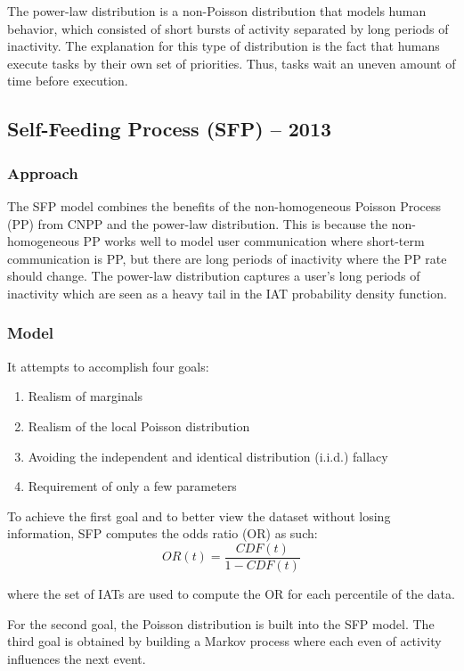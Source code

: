 \documentclass[11pt, oneside]{article}   	%
\begin{document}
\quad The power-law distribution is a non-Poisson distribution that models human behavior, which consisted of short bursts of activity separated by long periods of inactivity.
The explanation for this type of distribution is the fact that humans execute tasks by their own set of priorities.
Thus, tasks wait an uneven amount of time before execution.

\subsection*{Self-Feeding Process (SFP) -- 2013}

\subsubsection*{Approach}

\quad The SFP model combines the benefits of the non-homogeneous Poisson Process (PP) from CNPP and the power-law distribution.
This is because the non-homogeneous PP works well to model user communication where short-term communication is PP, but there are long periods of inactivity where the PP rate should change.
The power-law distribution captures a user's long periods of inactivity which are seen as a heavy tail in the IAT probability density function.

\subsubsection*{Model}

It attempts to accomplish four goals:
\begin{enumerate}
	\item Realism of marginals
	\item Realism of the local Poisson distribution
	\item Avoiding the independent and identical distribution (i.i.d.) fallacy
	\item Requirement of only a few parameters
\end{enumerate}

To achieve the first goal and to better view the dataset without losing information, SFP computes the odds ratio (OR) as such:
$$ OR(t) = \frac{CDF(t)}{1-CDF(t)} $$

where the set of IATs are used to compute the OR for each percentile of the data.

For the second goal, the Poisson distribution is built into the SFP model.
The third goal is obtained by building a Markov process where each even of activity influences the next event.
\end{document}
